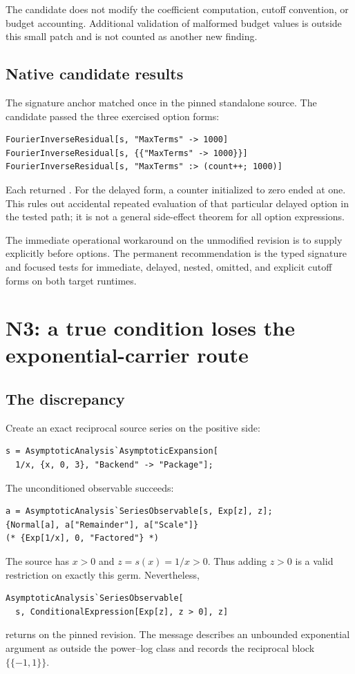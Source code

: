 \documentclass[11pt,letterpaper]{article}
\newcommand{\code}[1]{\texttt{\detokenize{#1}}}
\begin{document}
The candidate does not modify the coefficient computation, cutoff convention, or budget accounting. Additional validation of malformed budget values is outside this small patch and is not counted as another new finding.

\subsection{Native candidate results}

The signature anchor matched once in the pinned standalone source. The candidate passed the three exercised option forms:
\begin{lstlisting}
FourierInverseResidual[s, "MaxTerms" -> 1000]
FourierInverseResidual[s, {{"MaxTerms" -> 1000}}]
FourierInverseResidual[s, "MaxTerms" :> (count++; 1000)]
\end{lstlisting}
Each returned \code{"ZeroBelowCutoff" -> True}. For the delayed form, a counter initialized to zero ended at one. This rules out accidental repeated evaluation of that particular delayed option in the tested path; it is not a general side-effect theorem for all option expressions.

The immediate operational workaround on the unmodified revision is to supply \code{Automatic} explicitly before options. The permanent recommendation is the typed signature and focused tests for immediate, delayed, nested, omitted, and explicit cutoff forms on both target runtimes.

\section{N3: a true condition loses the exponential-carrier route}
\label{sec:n3}

\subsection{The discrepancy}

Create an exact reciprocal source series on the positive side:
\begin{lstlisting}
s = AsymptoticAnalysis`AsymptoticExpansion[
  1/x, {x, 0, 3}, "Backend" -> "Package"];
\end{lstlisting}
The unconditioned observable succeeds:
\begin{lstlisting}
a = AsymptoticAnalysis`SeriesObservable[s, Exp[z], z];
{Normal[a], a["Remainder"], a["Scale"]}
(* {Exp[1/x], 0, "Factored"} *)
\end{lstlisting}
The source has $x>0$ and $z=s(x)=1/x>0$. Thus adding $z>0$ is a valid restriction on exactly this germ. Nevertheless,
\begin{lstlisting}
AsymptoticAnalysis`SeriesObservable[
  s, ConditionalExpression[Exp[z], z > 0], z]
\end{lstlisting}
returns \code{Failure["ExponentialScale",...]} on the pinned revision. The message describes an unbounded exponential argument as outside the power--log class and records the reciprocal block $\{\{-1,1\}\}$.
\end{document}
